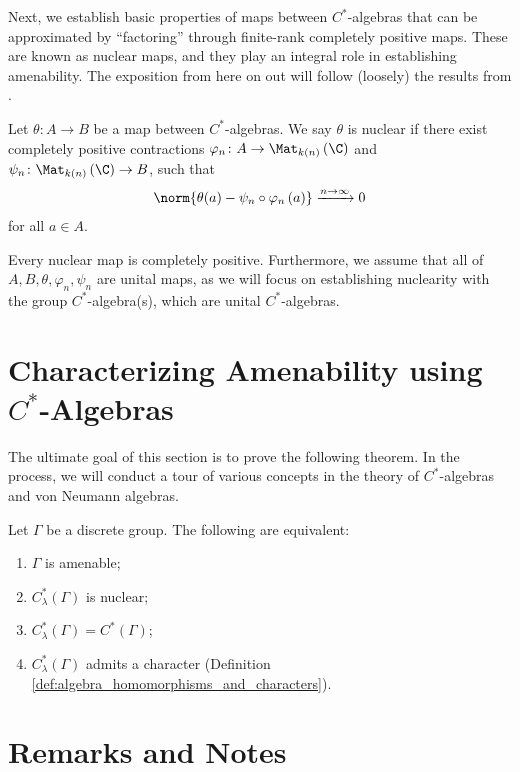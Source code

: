 Next, we establish basic properties of maps between $C^{\ast}$-algebras that can be approximated by ``factoring'' through finite-rank completely positive maps. These are known as nuclear maps, and they play an integral role in establishing amenability. The exposition from here on out will follow (loosely) the results from \cite{brown_and_ozawa}.
\begin{definition}
  Let $\theta\colon A\rightarrow B$ be a map between $C^{\ast}$-algebras. We say $\theta$ is nuclear if there exist completely positive contractions $\varphi_n\colon A\rightarrow \Mat_{k(n)}\left( \C \right)$ and $\psi_n\colon \Mat_{k(n)}\left( \C \right)\rightarrow B$, such that
  \begin{align*}
    \norm{\theta(a) - \psi_n\circ \varphi_n\left( a \right)}\xrightarrow{n\rightarrow\infty} 0
  \end{align*}
  for all $a\in A$.
\end{definition}
\begin{remark}
Every nuclear map is completely positive. Furthermore, we assume that all of $A,B,\theta,\varphi_n,\psi_n$ are unital maps, as we will focus on establishing nuclearity with the group $C^{\ast}$-algebra(s), which are unital $C^{\ast}$-algebras.
\end{remark}

\section{Characterizing Amenability using \texorpdfstring{$C^{\ast}$-Algebras}{C*-Algebras}}%
The ultimate goal of this section is to prove the following theorem. In the process, we will conduct a tour of various concepts in the theory of $C^{\ast}$-algebras and von Neumann algebras.
\begin{theorem}
  Let $\Gamma$ be a discrete group. The following are equivalent:
  \begin{enumerate}[(1)]
    \item $\Gamma$ is amenable;
    \item $C^{\ast}_{\lambda}\left( \Gamma \right)$ is nuclear;
    \item $C^{\ast}_{\lambda}\left( \Gamma \right) = C^{\ast}\left( \Gamma \right)$;
    \item $C^{\ast}_{\lambda}\left( \Gamma \right)$ admits a character (Definition \ref{def:algebra_homomorphisms_and_characters}).
  \end{enumerate}
\end{theorem}
\section{Remarks and Notes}%

